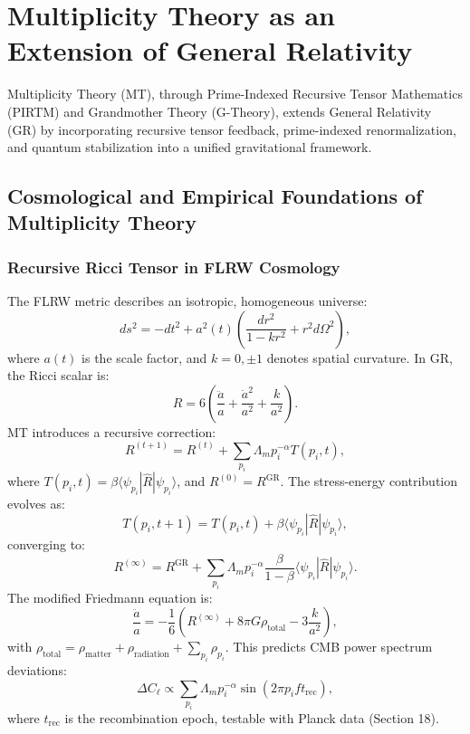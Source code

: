 \documentclass[12]{amsart}
\theoremstyle{plain}
\begin{document}
\section{Multiplicity Theory as an Extension of General Relativity}
Multiplicity Theory (MT), through Prime-Indexed Recursive Tensor Mathematics (PIRTM) and Grandmother Theory (G-Theory), extends General Relativity (GR) by incorporating recursive tensor feedback, prime-indexed renormalization, and quantum stabilization into a unified gravitational framework.

\subsection{Cosmological and Empirical Foundations of Multiplicity Theory}

\subsubsection{Recursive Ricci Tensor in FLRW Cosmology}
The FLRW metric describes an isotropic, homogeneous universe:
\begin{equation}
ds^2 = -dt^2 + a^2(t) \left( \frac{dr^2}{1 - k r^2} + r^2 d\Omega^2 \right),
\end{equation}
where \( a(t) \) is the scale factor, and \( k = 0, \pm 1 \) denotes spatial curvature. In GR, the Ricci scalar is:
\begin{equation}
R = 6 \left( \frac{\ddot{a}}{a} + \frac{\dot{a}^2}{a^2} + \frac{k}{a^2} \right).
\end{equation}
MT introduces a recursive correction:
\begin{equation}
R^{(t+1)} = R^{(t)} + \sum_{p_i} \Lambda_m p_i^{-\alpha} T(p_i, t),
\end{equation}
where \( T(p_i, t) = \beta \langle \psi_{p_i} | \hat{R} | \psi_{p_i} \rangle \), and \( R^{(0)} = R^{\text{GR}} \). The stress-energy contribution evolves as:
\begin{equation}
T(p_i, t+1) = T(p_i, t) + \beta \langle \psi_{p_i} | \hat{R} | \psi_{p_i} \rangle,
\end{equation}
converging to:
\begin{equation}
R^{(\infty)} = R^{\text{GR}} + \sum_{p_i} \Lambda_m p_i^{-\alpha} \frac{\beta}{1 - \beta} \langle \psi_{p_i} | \hat{R} | \psi_{p_i} \rangle.
\end{equation}
The modified Friedmann equation is:
\begin{equation}
\frac{\ddot{a}}{a} = -\frac{1}{6} \left( R^{(\infty)} + 8 \pi G \rho_{\text{total}} - 3 \frac{k}{a^2} \right),
\end{equation}
with \( \rho_{\text{total}} = \rho_{\text{matter}} + \rho_{\text{radiation}} + \sum_{p_i} \rho_{p_i} \). This predicts CMB power spectrum deviations:
\begin{equation}
\Delta C_\ell \propto \sum_{p_i} \Lambda_m p_i^{-\alpha} \sin(2 \pi p_i f t_{\text{rec}}),
\end{equation}
where \( t_{\text{rec}} \) is the recombination epoch, testable with Planck data (Section 18).
\end{document}
